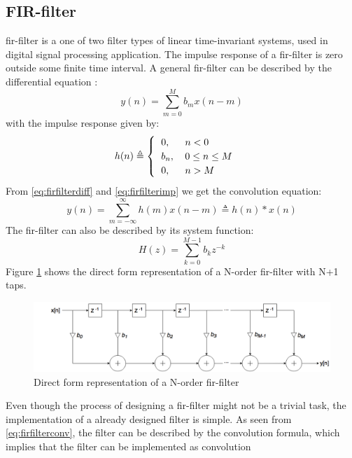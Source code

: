 \subsection{FIR-filter}
\gls{fir}-filter is a one of two filter types of linear time-invariant systems, used in digital signal processing application. The impulse response of a \gls{fir}-filter is zero outside some finite time interval.
A general \gls{fir}-filter can be described by the differential equation \cite{FILTERSWEB07}:
\begin{equation}
    y(n)=\sum\limits_{m=0}^{M} b_mx(n-m)
    \label{eq:firfilterdiff}
\end{equation}
with the impulse response given by:
\begin{equation}
    h(n)\triangleq
    \begin{cases}
    \begin{tabular}{ll}
      $0,$ & $n < 0$  \\
      $b_n,$ & $0 \leq n \leq M$  \\
      $0,$ & $n > M$   
      \end{tabular}
    \end{cases}
    \label{eq:firfilterimp}
\end{equation}
From \cref{eq:firfilterdiff} and \cref{eq:firfilterimp} we get the convolution equation:
\begin{equation}
    y(n)=\sum\limits_{m=-\infty}^{\infty} h(m)x(n-m) \triangleq h(n) \ast x(n)
    \label{eq:firfilterconv}
\end{equation}
The \gls{fir}-filter can also be described by its system function:
\begin{equation}
    H(z)=\sum\limits_{k=0}^{M-1} b_kz^{-k}
    \label{eq:firfiltersys}
\end{equation}
Figure \ref{fig:firfilter} shows the direct form representation of a N-order \gls{fir}-filter with N+1 taps. 
\begin{figure}[hbpt]
\centering
\includegraphics[width=\textwidth]{../figs/FIRFilter.png}
\caption{\label{fig:firfilter}Direct form representation of a N-order \gls{fir}-filter}
\end{figure}
Even though the process of designing a \gls{fir}-filter might not be a trivial task, the implementation of a already designed filter is simple. As seen from \cref{eq:firfilterconv}, the filter can be described by the convolution formula, which implies that the filter can be implemented as convolution 

